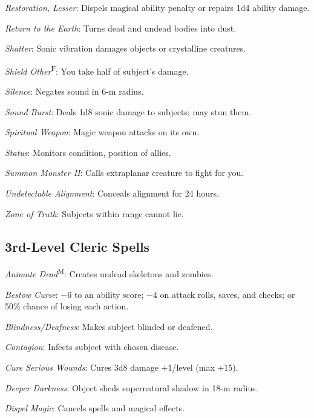 \textit{Restoration, Lesser}: Dispels magical ability penalty or repairs 1d4 ability damage.

\textit{Return to the Earth}: Turns dead and undead bodies into dust.

\textit{Shatter}: Sonic vibration damages objects or crystalline creatures.

\textit{Shield Other}\textsuperscript{F}: You take half of subject's damage.

\textit{Silence}: Negates sound in 6-m radius.

\textit{Sound Burst}: Deals 1d8 sonic damage to subjects; may stun them.

\textit{Spiritual Weapon}: Magic weapon attacks on its own.

\textit{Status}: Monitors condition, position of allies.

\textit{Summon Monster II}: Calls extraplanar creature to fight for you.

\textit{Undetectable Alignment}: Conceals alignment for 24 hours.

\textit{Zone of Truth}: Subjects within range cannot lie.



\subsection{3rd-Level Cleric Spells}

\textit{Animate Dead}\textsuperscript{M}: Creates undead skeletons and zombies.

\textit{Bestow Curse}: $-6$ to an ability score; $-4$ on attack rolls, saves, and checks; or 50\% chance of losing each action.

\textit{Blindness/Deafness}: Makes subject blinded or deafened.

\textit{Contagion}: Infects subject with chosen disease.



\textit{Cure Serious Wounds}: Cures 3d8 damage +1/level (max +15).


\textit{Deeper Darkness}: Object sheds supernatural shadow in 18-m radius.

\textit{Dispel Magic}: Cancels spells and magical effects.

